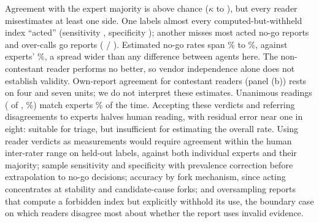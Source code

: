 \documentclass{article}
\begin{document}
Agreement with the expert majority is above chance ($\kappa$ \llmKappaMin{} to \llmKappaMax), but every reader misestimates at least one side. One labels almost every computed-but-withheld index ``acted'' (sensitivity \llmGptAstraSens, specificity \llmGptAstraSpec); another misses most acted no-go reports and over-calls go reports (\llmGeminiProSens{} / \llmGeminiProSpec). Estimated no-go rates span \llmStopRateMin\% to \llmStopRateMax\%, against experts' \llmHumanStopRate\%, a spread wider than any difference between agents here. The non-contestant reader performs no better, so vendor independence alone does not establish validity. Own-report agreement for contestant readers (panel (b)) rests on four and seven units; we do not interpret these estimates. Unanimous readings (\llmUnanN{} of \sTwoN{}, \llmUnanSharePct\%) match experts \llmUnanAgree\% of the time. Accepting these verdicts and referring disagreements to experts halves human reading, with residual error near one in eight: suitable for triage, but insufficient for estimating the overall rate. Using reader verdicts as measurements would require agreement within the human inter-rater range on held-out labels, against both individual experts and their majority; sample sensitivity and specificity with prevalence correction before extrapolation to \stopN{} no-go decisions; accuracy by fork mechanism, since acting concentrates at stability and candidate-cause forks; and oversampling reports that compute a forbidden index but explicitly withhold its use, the boundary case on which readers disagree most about whether the report uses invalid evidence.

\begin{table}[!htbp]
\caption{The numbers behind Figure~\ref{fig:study2}A: \sTwoStopN{} no-go-side decisions
(weighted to the population) and \sTwoGoN{} go twins, majority of three reviewers,
case-clustered 95\% intervals in brackets.}
\label{tab:study2}
\centering
\footnotesize


\end{table}
\end{document}
